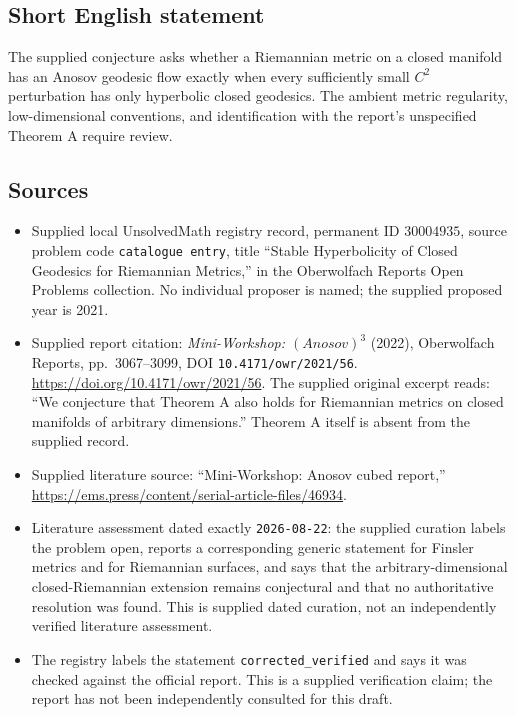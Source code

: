 \documentclass[11pt]{article}
\begin{document}
\subsection{Short English statement}
The supplied conjecture asks whether a Riemannian metric on a closed manifold has an Anosov geodesic flow exactly when every sufficiently small \(C^2\) perturbation has only hyperbolic closed geodesics. The ambient metric regularity, low-dimensional conventions, and identification with the report's unspecified Theorem A require review.
\subsection{Sources}
\begin{itemize}
\item Supplied local UnsolvedMath registry record, permanent ID \(30004935\), source problem code \texttt{catalogue entry}, title ``Stable Hyperbolicity of Closed Geodesics for Riemannian Metrics,'' in the Oberwolfach Reports Open Problems collection. No individual proposer is named; the supplied proposed year is 2021.
\item Supplied report citation: \emph{Mini-Workshop: \((Anosov)^3\)} (2022), Oberwolfach Reports, pp.\ 3067--3099, DOI \texttt{10.4171/owr/2021/56}. \url{https://doi.org/10.4171/owr/2021/56}. The supplied original excerpt reads: ``We conjecture that Theorem A also holds for Riemannian metrics on closed manifolds of arbitrary dimensions.'' Theorem A itself is absent from the supplied record.
\item Supplied literature source: ``Mini-Workshop: Anosov cubed report,'' \url{https://ems.press/content/serial-article-files/46934}.
\item Literature assessment dated exactly \texttt{2026-08-22}: the supplied curation labels the problem open, reports a corresponding generic statement for Finsler metrics and for Riemannian surfaces, and says that the arbitrary-dimensional closed-Riemannian extension remains conjectural and that no authoritative resolution was found. This is supplied dated curation, not an independently verified literature assessment.
\item The registry labels the statement \texttt{corrected\_verified} and says it was checked against the official report. This is a supplied verification claim; the report has not been independently consulted for this draft.
\end{itemize}
\end{document}
